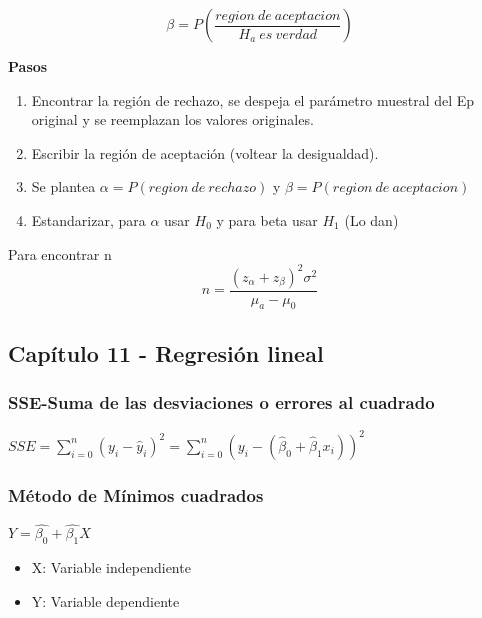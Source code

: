 $$\beta=P\left( \dfrac{region\ de\ aceptacion}{H_a\ es\ verdad}\right) $$

\textbf{Pasos}
\begin{enumerate}
	\item Encontrar la región de rechazo, se despeja el parámetro muestral del Ep original y se reemplazan los valores originales.
	\item Escribir la región de aceptación (voltear la desigualdad).
	\item Se plantea $\alpha=P(region\ de\ rechazo)$ y $\beta=P(region\ de\ aceptacion)$
	\item Estandarizar, para $\alpha$ usar $H_0$ y para beta usar $H_1$
	(Lo dan)
\end{enumerate}

Para encontrar n
$$n=\dfrac{(z_\alpha+z_\beta)^2\sigma^2}{\mu_a-\mu_0}$$
\subsection{Capítulo 11 - Regresión lineal}

\subsubsection{SSE-Suma de las desviaciones o errores al cuadrado}

$SSE=\sum_{i=0}^{n}(y_i-\hat{y}_i)^2=\sum_{i=0}^{n}(y_i-(\hat{\beta}_0+\hat{\beta}_1x_i))^2$

\subsubsection{Método de Mínimos cuadrados}

$Y=\hat{\beta_0}+\hat{\beta_1}X$
\begin{itemize}
	\item X: Variable independiente
	\item Y: Variable dependiente
\end{itemize}


